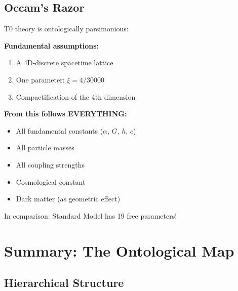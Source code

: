 	\subsection{Occam's Razor}
	
	\begin{keyresult}
		T0 theory is ontologically parsimonious:
		
		\vspace{0.3cm}
		
		\textbf{Fundamental assumptions:}
		\begin{enumerate}
			\item A 4D-discrete spacetime lattice
			\item One parameter: $\xi = 4/30000$
			\item Compactification of the 4th dimension
		\end{enumerate}
		
		\vspace{0.3cm}
		
		\textbf{From this follows EVERYTHING:}
		\begin{itemize}
			\item All fundamental constants ($\alpha$, $G$, $h$, $c$)
			\item All particle masses
			\item All coupling strengths
			\item Cosmological constant
			\item Dark matter (as geometric effect)
		\end{itemize}
		
		\vspace{0.3cm}
		
		In comparison: Standard Model has 19 free parameters!
	\end{keyresult}
	
	\section{Summary: The Ontological Map}
	
	\subsection{Hierarchical Structure}
	
